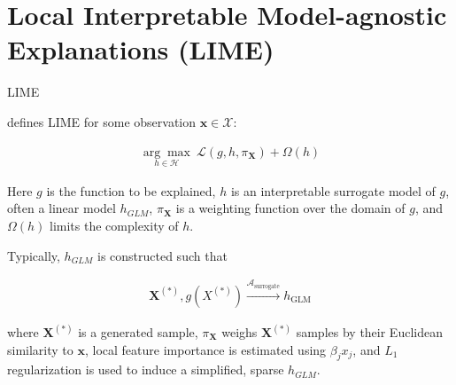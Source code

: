 \section{Local Interpretable Model-agnostic Explanations (LIME)}
\begin{frame}[c]
\Huge{\centerline{LIME}}
\end{frame}
\begin{frame}
	\cite{lime} defines LIME for some observation $\mathbf{x} \in \mathcal{X}$:

	\begin{equation}
	\begin{aligned}
	\underset{h \in \mathcal{H}}{\arg\max}\:\mathcal{L}(g, h, \pi_{\mathbf{X}}) + \Omega(h)
	\end{aligned}
	\end{equation}

	Here $g$ is the function to be explained, $h$ is an interpretable surrogate model of $g$, often a linear model $h_{GLM}$, $\pi_{\mathbf{X}}$ is a weighting function over the domain of $g$, and $\Omega(h)$ limits the complexity of $h$.

	\vspace{5pt}

	Typically, $h_{GLM}$ is constructed such that

	\begin{equation}
	\begin{aligned}
	\mathbf{X}^{(*)}, g({X}^{(*)}) \xrightarrow{\mathcal{A}_{\text{surrogate}}} h_{\text{GLM}}
	\end{aligned}
	\end{equation}

	where $\mathbf{X}^{(*)}$ is a generated sample, $\pi_{\mathbf{X}}$ weighs $\mathbf{X}^{(*)}$ samples by their Euclidean similarity to $\mathbf{x}$, local feature importance is estimated using $\beta_j x_j$, and $L_1$ regularization is used to induce a simplified, sparse $h_{GLM}$. 
\end{frame}		

